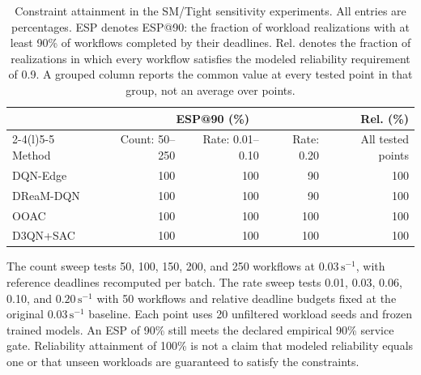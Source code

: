 \begin{table}[t]
\centering
\caption{Constraint attainment in the SM/Tight sensitivity experiments.
All entries are percentages. ESP denotes ESP@90: the fraction of workload
realizations with at least 90\% of workflows completed by their deadlines.
Rel. denotes the fraction of realizations in which every workflow satisfies
the modeled reliability requirement of 0.9. A grouped column reports the
common value at every tested point in that group, not an average over points.}
\label{tab:workload_sensitivity_attainment}
\small
\setlength{\tabcolsep}{8pt}
\renewcommand{\arraystretch}{1.15}
\begin{tabular}{@{}lrrrr@{}}
\toprule
& \multicolumn{3}{c}{ESP@90 (\%)} & Rel. (\%) \\
\cmidrule(lr){2-4}\cmidrule(l){5-5}
Method & Count: 50--250 & Rate: 0.01--0.10 & Rate: 0.20 & All tested points \\
\midrule
DQN-Edge & 100 & 100 & 90 & 100 \\
DReaM-DQN & 100 & 100 & 90 & 100 \\
OOAC & 100 & 100 & 100 & 100 \\
D3QN+SAC & 100 & 100 & 100 & 100 \\
\bottomrule
\end{tabular}
\par\smallskip
\begin{minipage}{0.98\textwidth}
\footnotesize
The count sweep tests 50, 100, 150, 200, and 250 workflows at
$0.03\,\mathrm{s}^{-1}$, with reference deadlines recomputed per batch.
The rate sweep tests 0.01, 0.03, 0.06, 0.10, and
$0.20\,\mathrm{s}^{-1}$ with 50 workflows and relative deadline budgets
fixed at the original $0.03\,\mathrm{s}^{-1}$ baseline.
Each point uses 20 unfiltered workload seeds and frozen trained models.
An ESP of 90\% still meets the declared empirical 90\% service gate.
Reliability attainment of 100\% is not a claim that modeled reliability
equals one or that unseen workloads are guaranteed to satisfy the constraints.
\end{minipage}
\end{table}
